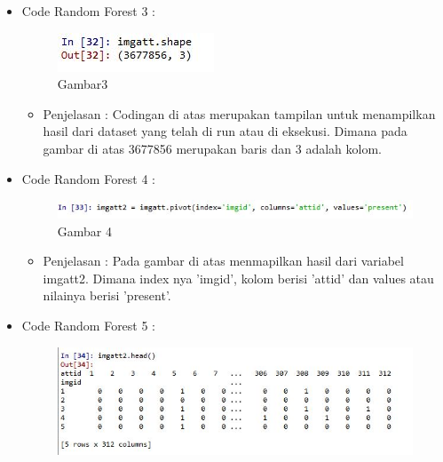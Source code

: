 \begin{enumerate}
\begin{itemize}
\begin{itemize}
\par
\par
\end{itemize}
\item Code Random Forest 3 :
\par
\begin{figure}[ht]
\centering
\includegraphics[scale=0.7]{figures/AFS/4c.jpg}
\caption{Gambar3}
\label{contoh}
\end{figure}
\par
\begin{itemize}
\item Penjelasan : Codingan di atas merupakan tampilan untuk menampilkan hasil dari dataset yang telah di run atau di eksekusi. Dimana pada gambar di atas 3677856 merupakan baris dan 3 adalah kolom.
\par
\par
\end{itemize}
\item Code Random Forest 4 :
\par
\begin{figure}[ht]
\centering
\includegraphics[scale=0.7]{figures/AFS/4d.jpg}
\caption{Gambar 4}
\label{contoh}
\end{figure}
\par
\begin{itemize}
\item Penjelasan : Pada gambar di atas menmapilkan hasil dari variabel imgatt2. Dimana index nya 'imgid', kolom berisi 'attid' dan values atau nilainya berisi 'present'.
\par
\par
\end{itemize}
\item Code Random Forest 5 :
\par
\begin{figure}[ht]
\centering
\includegraphics[scale=0.7]{figures/AFS/4e.jpg}

\end{figure}
\end{itemize}
\end{enumerate}
